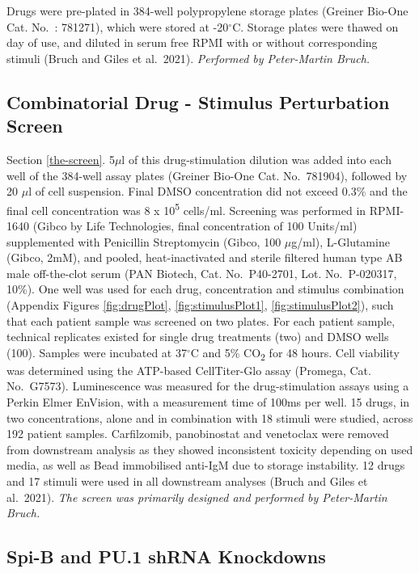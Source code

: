 \documentclass[11pt, a4paper, twosided]{book}
\begin{document}
Drugs were pre-plated in 384-well polypropylene storage plates (Greiner Bio-One Cat. No.~: 781271), which were stored at -20\(^\circ\)C. Storage plates were thawed on day of use, and diluted in serum free RPMI with or without corresponding stimuli (Bruch and Giles et al.~2021). \emph{Performed by Peter-Martin Bruch. }

\hypertarget{thescreen}{%
\subsection{Combinatorial Drug - Stimulus Perturbation Screen}\label{thescreen}}

Section \ref{the-screen}. 5\(\mu\)l of this drug-stimulation dilution was added into each well of the 384-well assay plates (Greiner Bio-One Cat. No.~781904), followed by 20 \(\mu\)l of cell suspension. Final DMSO concentration did not exceed 0.3\% and the final cell concentration was 8 x 10\textsuperscript{5} cells/ml. Screening was performed in RPMI-1640 (Gibco by Life Technologies, final concentration of 100 Units/ml) supplemented with Penicillin Streptomycin (Gibco, 100 \(\mu\)g/ml), L-Glutamine (Gibco, 2mM), and pooled, heat-inactivated and sterile filtered human type AB male off-the-clot serum (PAN Biotech, Cat. No.~P40-2701, Lot. No.~P-020317, 10\%). One well was used for each drug, concentration and stimulus combination (Appendix Figures \ref{fig:drugPlot}, \ref{fig:stimulusPlot1}, \ref{fig:stimulusPlot2}), such that each patient sample was screened on two plates. For each patient sample, technical replicates existed for single drug treatments (two) and DMSO wells (100). Samples were incubated at 37\(^\circ\)C and 5\% CO\textsubscript{2} for 48 hours. Cell viability was determined using the ATP-based CellTiter-Glo assay (Promega, Cat. No.~G7573). Luminescence was measured for the drug-stimulation assays using a Perkin Elmer EnVision, with a measurement time of 100ms per well. 15 drugs, in two concentrations, alone and in combination with 18 stimuli were studied, across 192 patient samples. Carfilzomib, panobinostat and venetoclax were removed from downstream analysis as they showed inconsistent toxicity depending on used media, as well as Bead immobilised anti-IgM due to storage instability. 12 drugs and 17 stimuli were used in all downstream analyses (Bruch and Giles et al.~2021). \emph{The screen was primarily designed and performed by Peter-Martin Bruch. }

\hypertarget{shRNA-KDs-method}{%
\subsection{Spi-B and PU.1 shRNA Knockdowns}\label{shRNA-KDs-method}}
\end{document}
